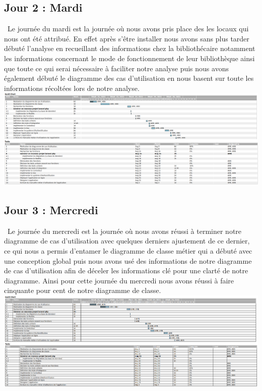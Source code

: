 \documentclass[12pt,a4paper]{article}
\begin{document}
\newpage
\subsection{Jour 2 : Mardi}
\ Le journée du mardi est la journée où nous avons pris place des les locaux qui nous ont été attribué. En effet après s’être installer nous avons sans plus tarder débuté l’analyse en recueillant des informations chez la bibliothécaire notamment les informations concernant le mode de fonctionnement de leur bibliothèque ainsi que toute ce qui serai nécessaire à faciliter notre analyse puis nous avons également débuté le diagramme des cas d’utilisation en nous basent sur toute les informations récoltées lors de notre analyse.\\
\includegraphics[scale=0.25]{images/jour2.png}\\

\subsection{Jour 3 : Mercredi}
\ Le journée du mercredi est la journée où nous avons réussi à terminer notre diagramme de cas d’utilisation avec quelques derniers ajustement de ce dernier, ce qui nous a permis d’entamer le diagramme de classe métier qui a débuté avec une conception global puis nous avons usé des informations de notre diagramme de cas d’utilisation afin de déceler les informations clé pour une clarté de notre diagramme. Ainsi pour cette journée du mercredi nous avons réussi à faire cinquante pour cent de notre diagramme de classe.\\
\includegraphics[scale=0.25]{images/jour3.png}
\end{document}
